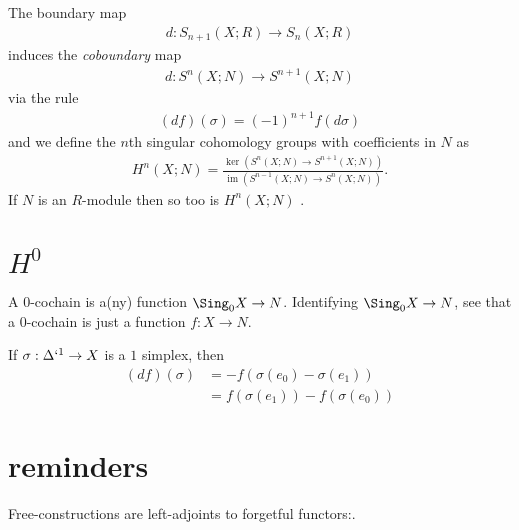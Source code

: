 The boundary map
\begin{align*}
  d: S_{n+1}(X ; R) \rightarrow S_n(X ; R)
\end{align*}
induces the \emph{coboundary} map
\begin{align*}
  d: S^n(X ; N) \rightarrow S^{n+1}(X ; N)
\end{align*}
via the rule
\begin{align*}
  (d f)(\sigma)=(-1)^{n+1} f(d \sigma)
\end{align*}
and we define the $n$th singular cohomology groups with coefficients in $N$ as
\begin{align*}
  H^n(X ; N)=\frac{\operatorname{ker}\left(S^n(X ; N) \rightarrow S^{n+1}(X ; N)\right)}{\operatorname{im}\left(S^{n-1}(X ; N) \rightarrow S^n(X ; N)\right)}.
\end{align*}
If $N$ is an $R$-module then so too is $H^n(X;N)$ .
\section{$H^0$}
A $0$-cochain is a(ny) function $\Sing_0 X \to N$. Identifying $\Sing_0 X \to N$, see that a $0$-cochain is just a function $f:X\to N$.

If $\sigma: \Delta`^1 \to X$ is a $1$ simplex, then
\begin{align*}
  \left(d f\right)(\sigma) & = -f \left(\sigma(e_0) - \sigma(e_1)\right) \\
                           & = f(\sigma(e_1)) - f(\sigma(e_0))
\end{align*}


\section{}






\section{reminders}
Free-constructions are left-adjoints to forgetful functors:.







